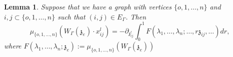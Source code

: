 \documentclass[11pt]{amsart}
\newtheorem{lem}[thm]{Lemma}
\theoremstyle{definition}
\theoremstyle{remark}
\numberwithin{equation}{section}
\begin{document}
\begin{lem}\label{IntegralR}
  Suppose that we have a graph with vertices $\{o,1,\dots,n\}$ and $i,j\subset \{o,1,\dots,n\}$ such that $(i,j)\in E_{\Gamma}$. Then
  $$
  \mu_{\{o,1,\dots, n\}}\left(W_{\Gamma}(\mathfrak{z}_{e})\cdot x^l_{ij}\right)=-\partial_{\mathfrak{z}^l_{ij}}\int^1_0F(\lambda_1,\dots,\lambda_{n};\dots,r\mathfrak{z}_{ij},\dots)dr,
  $$
  where $F(\lambda_1,\dots,\lambda_{n};\mathfrak{z}_e):=\mu_{\{o,1,\dots, n\}}\left(W_{\Gamma}(\mathfrak{z}_{e})\right)$
\end{lem}
\begin{figure}[htp]
  \centering



\begin{tikzpicture}[x=0.75pt,y=0.75pt,yscale=-1,xscale=1]


\end{tikzpicture}
\end{figure}
\end{document}
